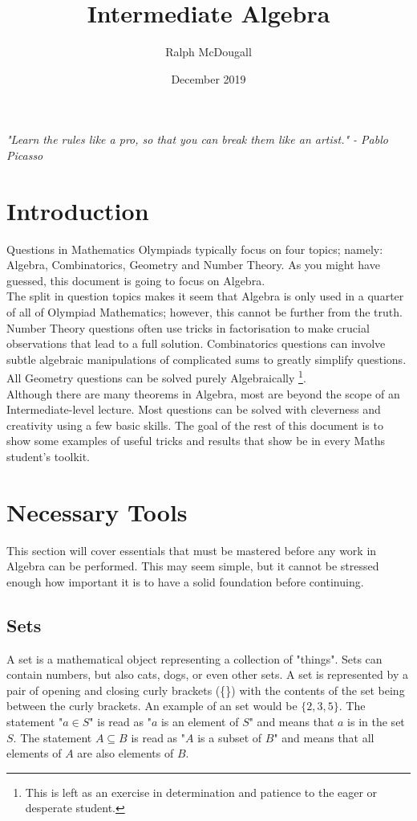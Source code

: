 \documentclass[a4paper,12pt]{article}
\begin{document}
\title{Intermediate Algebra}
\author{Ralph McDougall}
\date{December 2019}
\maketitle

\centerline{ \textit{"Learn the rules like a pro, so that you can break them like an artist." - Pablo Picasso} }

\section{Introduction}

Questions in Mathematics Olympiads typically focus on four topics; namely: Algebra, Combinatorics, Geometry and Number Theory. As you might have guessed, this document is going to focus on Algebra. \\

The split in question topics makes it seem that Algebra is only used in a quarter of all of Olympiad Mathematics; however, this cannot be further from the truth. Number Theory questions often use tricks in factorisation to make crucial observations that lead to a full solution. Combinatorics questions can involve subtle algebraic manipulations of complicated sums to greatly simplify questions. All Geometry questions can be solved purely Algebraically \footnote{This is left as an exercise in determination and patience to the eager or desperate student.}. \\

Although there are many theorems in Algebra, most are beyond the scope of an Intermediate-level lecture. Most questions can be solved with cleverness and creativity using a few basic skills. The goal of the rest of this document is to show some examples of useful tricks and results that show be in every Maths student's toolkit.\\


\section{Necessary Tools}
This section will cover essentials that must be mastered before any work in Algebra can be performed. This may seem simple, but it cannot be stressed enough how important it is to have a solid foundation before continuing.

\subsection{Sets}
A set is a mathematical object representing a collection of "things". Sets can contain numbers, but also cats, dogs, or even other sets. A set is represented by a pair of opening and closing curly brackets (\{\}) with the contents of the set being between the curly brackets. An example of an set would be $\{2, 3, 5\}$. The statement "$a \in S$" is read as "$a$ is an element of $S$" and means that $a$ is in the set $S$. The statement $A \subseteq B$ is read as "$A$ is a subset of $B$" and means that all elements of $A$ are also elements of $B$.
\end{document}
